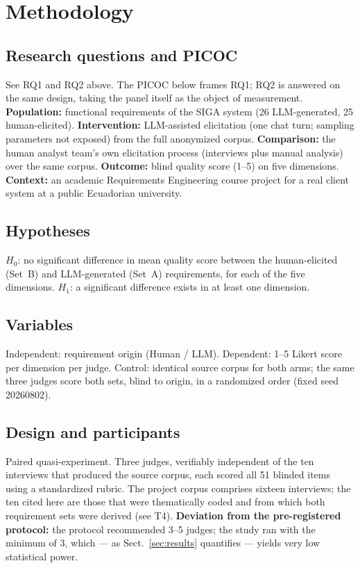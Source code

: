 \documentclass{llncs}
\begin{document}
\section{Methodology}

\subsection{Research questions and PICOC}
See RQ1 and RQ2 above. The PICOC below frames RQ1; RQ2 is answered on the same design,
taking the panel itself as the object of measurement. \textbf{Population:} functional requirements of the SIGA system (26
LLM-generated, 25 human-elicited). \textbf{Intervention:} LLM-assisted elicitation
(one chat turn; sampling parameters not exposed) from the full anonymized corpus.
\textbf{Comparison:} the human analyst team's own elicitation process (interviews plus
manual analysis) over the same corpus. \textbf{Outcome:} blind quality score (1--5) on
five dimensions. \textbf{Context:} an academic Requirements Engineering course project
for a real client system at a public Ecuadorian university.

\subsection{Hypotheses}
$H_0$: no significant difference in mean quality score between the human-elicited
(Set~B) and LLM-generated (Set~A) requirements, for each of the five dimensions.
$H_1$: a significant difference exists in at least one dimension.

\subsection{Variables}
Independent: requirement origin (Human / LLM). Dependent: 1--5 Likert score per
dimension per judge. Control: identical source corpus for both arms; the same three
judges score both sets, blind to origin, in a randomized order (fixed seed
20260802).

\subsection{Design and participants}
Paired quasi-experiment. Three judges, verifiably independent of the ten interviews
that produced the source corpus, each scored all 51 blinded items using a
standardized rubric. The project corpus comprises sixteen interviews; the ten cited
here are those that were thematically coded and from which both requirement sets were
derived (see T4). \textbf{Deviation from the pre-registered protocol:} the protocol
recommended 3--5 judges; the study ran with the minimum of 3, which --- as
Sect.~\ref{sec:results} quantifies --- yields very low statistical power.
\end{document}
